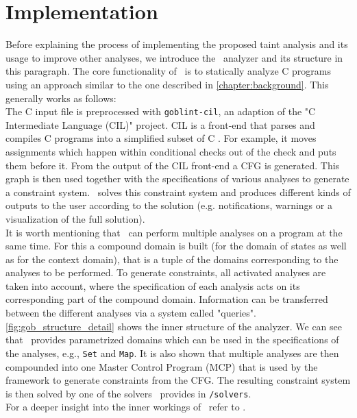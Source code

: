  \section{Implementation}\label{sec:implementation}
  Before explaining the process of implementing the proposed taint analysis and its usage to improve other analyses, we introduce the \gob\ analyzer and its structure in this paragraph. The core functionality of \gob\ is to statically analyze C programs using an approach similar to the one described in \autoref{chapter:background}. This generally works as follows:\\
  The C input file is preprocessed with \texttt{goblint-cil}, an adaption of the "C Intermediate Language (CIL)" project. CIL is a front-end that parses and compiles C programs into a simplified subset of C \parencite{goblintCil}. For example, it moves assignments which happen within conditional checks out of the check and puts them before it. From the output of the CIL front-end a CFG is generated. This graph is then used together with the specifications of various analyses to generate a constraint system. \gob\ solves this constraint system and produces different kinds of outputs to the user according to the solution (e.g. notifications, warnings or a visualization of the full solution).\\
  It is worth mentioning that \gob\ can perform multiple analyses on a program at the same time. For this a compound domain is built (for the domain of states as well as for the context domain), that is a tuple of the domains corresponding to the analyses to be performed. To generate constraints, all activated analyses are taken into account, where the specification of each analysis acts on its corresponding part of the compound domain. Information can be transferred between the different analyses via a system called "queries".\\
  \autoref{fig:gob_structure_detail} shows the inner structure of the analyzer. We can see that \gob\ provides parametrized domains which can be used in the specifications of the analyses, e.g., \texttt{Set} and \texttt{Map}. It is also shown that multiple analyses are then compounded into one Master Control Program (MCP) that is used by the framework to generate constraints from the CFG. The resulting constraint system is then solved by one of the solvers \gob\ provides in \texttt{/solvers}.\\  
  For a deeper insight into the inner workings of \gob\ refer to \parencite{apinis2014frameworks}.
  
